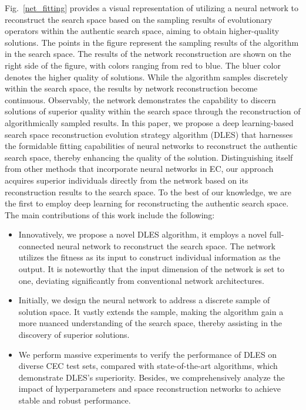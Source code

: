 \documentclass[journal,twoside]{IEEEtran}
\begin{document}
Fig.~\ref{net_fitting} provides a visual representation of utilizing a neural network to reconstruct the search space based on the sampling results of evolutionary operators within the authentic search space, aiming to obtain higher-quality solutions. The points in the figure represent the sampling results of the algorithm in the search space. The results of the network reconstruction are shown on the right side of the figure, with colors ranging from red to blue. The bluer color denotes the higher quality of solutions. While the algorithm samples discretely within the search space, the results by network reconstruction become continuous. Observably, the network demonstrates the capability to discern solutions of superior quality within the search space through the reconstruction of algorithmically sampled results. In this paper, we propose a deep learning-based search space reconstruction evolution strategy algorithm (DLES) that harnesses the formidable fitting capabilities of neural networks to reconstruct the authentic search space, thereby enhancing the quality of the solution. Distinguishing itself from other methods that incorporate neural networks in EC, our approach acquires superior individuals directly from the network based on its reconstruction results to the search space. To the best of our knowledge, we are the first to employ deep learning for reconstructing the authentic search space. The main contributions of this work include the following:
\begin{itemize}
	\item[1)] Innovatively, we propose a novel DLES algorithm, it employs a novel full-connected neural network to reconstruct the search space. The network utilizes the fitness as its input to construct individual information as the output. It is noteworthy that the input dimension of the network is set to one, deviating significantly from conventional network architectures.	
	
	\item[2)] Initially, we design the neural network to address a discrete sample of solution space. It vastly extends the sample, making the algorithm gain a more nuanced understanding of the search space, thereby assisting in the discovery of superior solutions.

	
	\item[3)] We perform massive experiments to verify the performance of DLES on diverse CEC test sets, compared with state-of-the-art algorithms, which demonstrate DLES's superiority. Besides, we comprehensively analyze the impact of hyperparameters and space reconstruction networks to achieve stable and robust performance. 
	
	
\end{itemize} 
\end{document}

